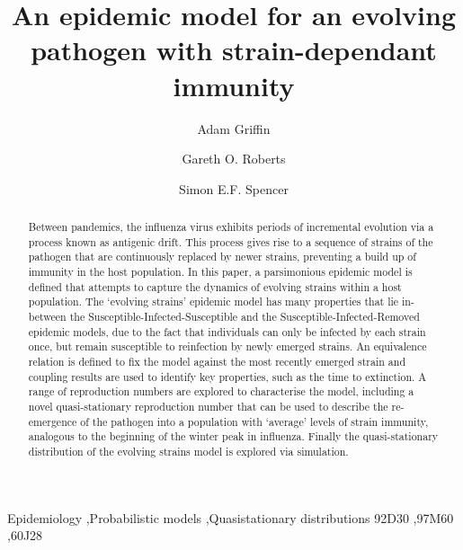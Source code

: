 \documentclass[review]{elsarticle}
\begin{document}
\begin{frontmatter}

\title{An epidemic model for an evolving pathogen with strain-dependant immunity}%


\author[mymainaddress,mysecondaryaddress]{Adam Griffin}

\author[mymainaddress]{Gareth O. Roberts}

\author[mymainaddress]{Simon E.F. Spencer}

\address[mymainaddress]{Department of Statistics, University of Warwick, Coventry, UK}
\address[mysecondaryaddress]{Adam to add current address}

\begin{abstract}
Between pandemics, the influenza virus exhibits periods of incremental evolution via a process known as antigenic drift. This process gives rise to a sequence of strains of the pathogen that are continuously replaced by newer strains, preventing a build up of immunity in the host population. In this paper, a parsimonious epidemic model is defined that attempts to capture the dynamics of evolving strains within a host population. The `evolving strains' epidemic model has many properties that lie in-between the Susceptible-Infected-Susceptible and the Susceptible-Infected-Removed epidemic models, due to the fact that individuals can only be infected by each strain once, but remain susceptible to reinfection by newly emerged strains. An equivalence relation is defined to fix the model against the most recently emerged strain and coupling results are used to identify key properties, such as the time to extinction. A range of reproduction numbers are explored to characterise the model, including a novel quasi-stationary reproduction number that can be used to describe the re-emergence of the pathogen into a population with `average' levels of strain immunity, analogous to the beginning of the winter peak in influenza. Finally the quasi-stationary distribution of the evolving strains model is explored via simulation.
\end{abstract}

\begin{keyword}
Epidemiology \sep Probabilistic models \sep Quasistationary distributions
\MSC[2010] 92D30 \sep 97M60 \sep 60J28
\end{keyword}

\end{frontmatter}
\end{document}
